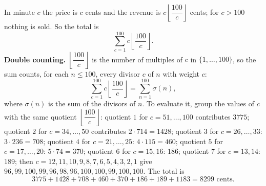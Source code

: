 In minute $c$ the price is $c$ cents and the revenue is $c\left\lfloor\dfrac{100}{c}\right\rfloor$ cents; for $c>100$ nothing is sold. So the total is
\[
\sum_{c=1}^{100}c\left\lfloor\dfrac{100}{c}\right\rfloor .
\]
\textbf{Double counting.} $\left\lfloor\dfrac{100}{c}\right\rfloor$ is the number of multiples of $c$ in $\{1,\dots,100\}$, so the sum counts, for each $n\le100$, every divisor $c$ of $n$ with weight $c$:
\[
\sum_{c=1}^{100}c\left\lfloor\dfrac{100}{c}\right\rfloor=\sum_{n=1}^{100}\sigma(n),
\]
where $\sigma(n)$ is the sum of the divisors of $n$. To evaluate it, group the values of $c$ with the same quotient $\left\lfloor\dfrac{100}{c}\right\rfloor$: quotient $1$ for $c=51,\dots,100$ contributes $3775$; quotient $2$ for $c=34,\dots,50$ contributes $2\cdot714=1428$; quotient $3$ for $c=26,\dots,33$: $3\cdot236=708$; quotient $4$ for $c=21,\dots,25$: $4\cdot115=460$; quotient $5$ for $c=17,\dots,20$: $5\cdot74=370$; quotient $6$ for $c=15,16$: $186$; quotient $7$ for $c=13,14$: $189$; then $c=12,11,10,9,8,7,6,5,4,3,2,1$ give $96,99,100,99,96,98,96,100,100,99,100,100$. The total is
\[
3775+1428+708+460+370+186+189+1183=\boxed{8299}\text{ cents}.
\]
